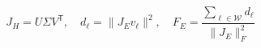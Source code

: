 \documentclass{article}
\begin{document}
\fontsize{22}{29}\selectfont
\[
J_H=U\Sigma V^{\mathsf T},\quad d_\ell=\|J_Ev_\ell\|^2,\quad F_E=\frac{\sum_{\ell\in\mathcal W}d_\ell}{\|J_E\|_F^2}
\]
\end{document}
